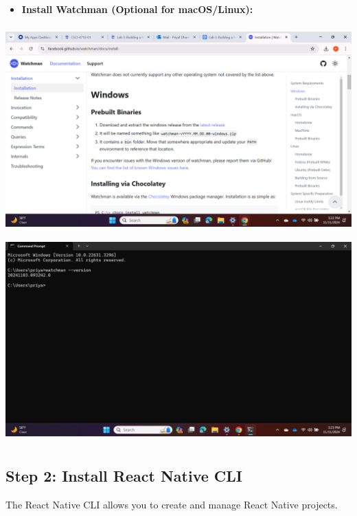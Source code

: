 \documentclass{article}
\begin{document}
\begin{itemize}
    \item \textbf{Install Watchman (Optional for macOS/Linux):} 
\end{itemize}
\includegraphics[width=5.57813in,height=3.13391in]{media/image1.png}
\includegraphics[width=5.57813in,height=3.13391in]{media/image27.png}


\subsection*{Step 2: Install React Native CLI}

The React Native CLI allows you to create and manage React Native projects.
\end{document}
